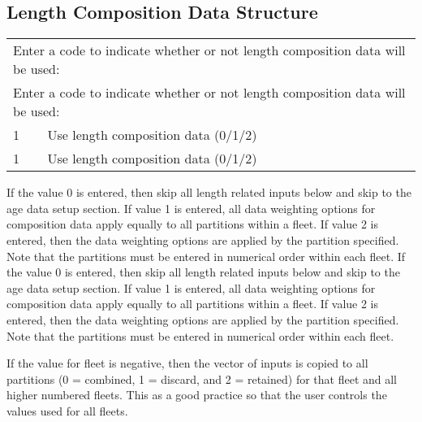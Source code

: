 \subsection{Length Composition Data Structure}
\begin{tabular}{p{2cm} p{14cm}}
		\multicolumn{2}{l}{Enter a code to indicate whether or not length composition data will be used:} \Tstrut\Bstrut\\
		\multicolumn{2}{l}{Enter a code to indicate whether or not length composition data will be used:} \Tstrut\Bstrut\\
		\hline	
		1 & Use length composition data (0/1/2) \Tstrut\Bstrut\\
		1 & Use length composition data (0/1/2) \Tstrut\Bstrut\\
		\hline									  
\end{tabular}

If the value 0 is entered, then skip all length related inputs below and skip to the age data setup section. If value 1 is entered, all data weighting options for composition data apply equally to all partitions within a fleet. If value 2 is entered, then the data weighting options are applied by the partition specified. Note that the partitions must be entered in numerical order within each fleet.
If the value 0 is entered, then skip all length related inputs below and skip to the age data setup section. If value 1 is entered, all data weighting options for composition data apply equally to all partitions within a fleet. If value 2 is entered, then the data weighting options are applied by the partition specified. Note that the partitions must be entered in numerical order within each fleet.

If the value for fleet is negative, then the vector of inputs is copied to all partitions (0 = combined, 1 = discard, and 2 = retained) for that fleet and all higher numbered fleets. This as a good practice so that the user controls the values used for all fleets.

